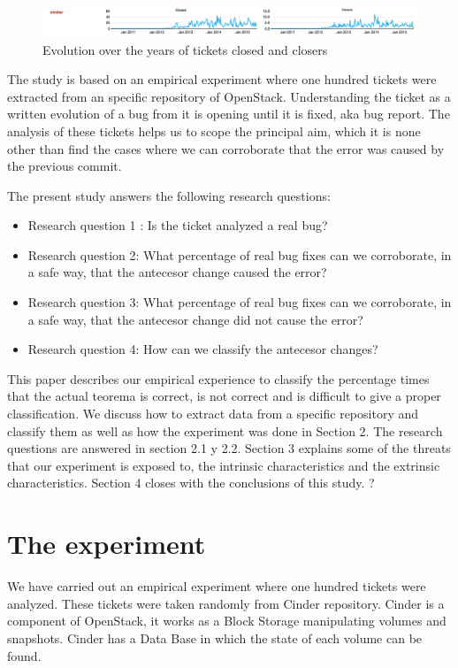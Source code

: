 \documentclass[a4paper]{article}
\begin{document}
\begin{figure}[htb]
\centering
\includegraphics[width=1\textwidth]{cinder}
\caption{Evolution over the years of tickets closed and closers   } \label{fig:cinder}
\end{figure}

The study is based on an empirical experiment where one hundred tickets were extracted from an specific repository of OpenStack. Understanding the ticket as a written evolution of a bug from it is opening until it is fixed, aka bug report. The analysis of these tickets helps us to scope the principal aim, which it is none other than find the cases where we can corroborate that the error was caused by the previous commit. 

The present study answers the following research questions:
\begin{itemize}
	\item Research question 1 : Is the ticket analyzed a real bug? 
	\item Research question 2: What percentage of real bug fixes can we corroborate, in a safe way, that the antecesor change caused the error? 
	\item Research question 3: What percentage of real bug fixes can we corroborate, in a safe way, that the antecesor change did not cause the error? 
	\item Research question 4: How can we classify the antecesor changes? 
\end{itemize}

This paper describes our empirical experience to classify the percentage times that the actual
teorema is correct, is not correct and is difficult to give a proper classification. We discuss how to extract data from a specific repository and classify them as well as how the experiment was done in Section 2. The research questions are answered in section 2.1 y 2.2. Section 3 explains some of the threats that our experiment is exposed to, the intrinsic characteristics and the extrinsic characteristics. Section 4 closes with the conclusions of this study. ?
\section{The experiment}

We have carried out an empirical experiment where one hundred tickets were analyzed. These tickets were taken randomly from Cinder repository. Cinder is a component of OpenStack, it works as a Block Storage manipulating volumes and snapshots. Cinder has a Data Base in which the state of each volume can be found. 
\end{document}
